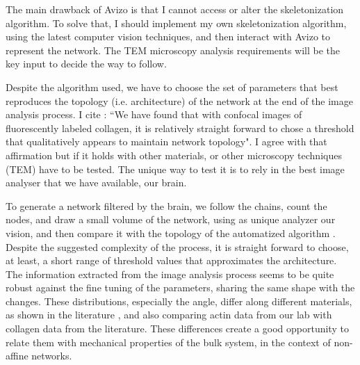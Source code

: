The main drawback of Avizo is that I cannot access or alter the
skeletonization algorithm.
To solve that, I should implement my own skeletonization algorithm, using the
latest computer vision techniques\citep{bai_skeleton_2007}, and then interact with Avizo to represent the network.
The TEM microscopy analysis
requirements will be the key input to decide the way to follow.

Despite the algorithm used, we have to choose the set of parameters that best reproduces the topology (i.e.
architecture) of the network at the end of the image analysis process.
I cite \citet{stein_algorithm_2008}: ``We have found that with confocal
images of fluorescently labeled collagen, it is relatively straight forward
to chose a threshold that qualitatively appears to maintain
network topology". I agree with that affirmation but if it holds with
other materials, or other microscopy techniques (TEM) have to be tested. The
unique way to test it is to rely in the best image analyser that we have available, our brain.

To generate a network filtered by the brain, we follow the chains, count
the nodes, and draw a small volume of the network, using as unique analyzer our vision, and then
compare it with the topology of the automatized algorithm
\citep{chandran_affine_2006}.
Despite the suggested complexity of the process,
it is straight forward to choose, at least, a short range of threshold values that approximates the architecture. The
 information extracted from the image analysis process seems to be quite robust
against the fine tuning of the parameters, sharing the same shape with the
changes.
These distributions, especially the angle, differ along
different materials, as shown in the literature
\citep{lindstrom_finite-strain_2013}, and also comparing actin data from our lab
with collagen data from the literature\citep{lindstrom_biopolymer_2010}. These
differences create a good opportunity to relate them with mechanical properties of the bulk
system, in the context of non-affine networks.





